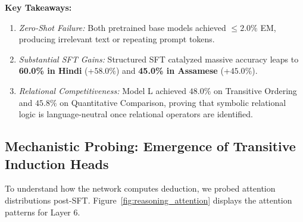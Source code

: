 \documentclass[11pt,a4paper]{article}
\begin{document}
\begin{table}[htbp]
\centering
\small
\caption{Downstream Reasoning Exact Match (EM) Scorecard on 0\% Leakage Test Splits.}
\label{tab:reasoning_results}
\vspace{2pt}
\end{table}

\noindent\textbf{Key Takeaways:}
\begin{enumerate}[noitemsep]
    \item \textit{Zero-Shot Failure:} Both pretrained base models achieved $\le 2.0\%$ EM, producing irrelevant text or repeating prompt tokens.
    \item \textit{Substantial SFT Gains:} Structured SFT catalyzed massive accuracy leaps to \textbf{60.0\% in Hindi} (+$58.0\%$) and \textbf{45.0\% in Assamese} (+$45.0\%$).
    \item \textit{Relational Competitiveness:} Model L achieved $48.0\%$ on Transitive Ordering and $45.8\%$ on Quantitative Comparison, proving that symbolic relational logic is language-neutral once relational operators are identified.
\end{enumerate}

\subsection{Mechanistic Probing: Emergence of Transitive Induction Heads}
To understand how the network computes deduction, we probed attention distributions post-SFT. Figure~\ref{fig:reasoning_attention} displays the attention patterns for Layer 6.
\end{document}
